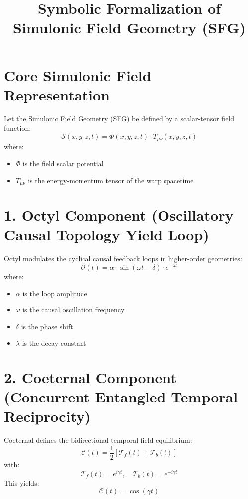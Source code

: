 \documentclass{article}
\begin{document}
\title{Symbolic Formalization of Simulonic Field Geometry (SFG)}
\author{}
\date{}
\maketitle

\section*{Core Simulonic Field Representation}

Let the Simulonic Field Geometry (SFG) be defined by a scalar-tensor field function:
\[
\mathcal{S}(x, y, z, t) = \Phi(x, y, z, t) \cdot T_{\mu\nu}(x, y, z, t)
\]
where:
\begin{itemize}
    \item $\Phi$ is the field scalar potential
    \item $T_{\mu\nu}$ is the energy-momentum tensor of the warp spacetime
\end{itemize}

\section*{1. Octyl Component (Oscillatory Causal Topology Yield Loop)}

Octyl modulates the cyclical causal feedback loops in higher-order geometries:
\[
\mathcal{O}(t) = \alpha \cdot \sin(\omega t + \delta) \cdot e^{-\lambda t}
\]
where:
\begin{itemize}
    \item $\alpha$ is the loop amplitude
    \item $\omega$ is the causal oscillation frequency
    \item $\delta$ is the phase shift
    \item $\lambda$ is the decay constant
\end{itemize}

\section*{2. Coeternal Component (Concurrent Entangled Temporal Reciprocity)}

Coeternal defines the bidirectional temporal field equilibrium:
\[
\mathcal{C}(t) = \frac{1}{2} \left[ \mathcal{T}_f(t) + \mathcal{T}_b(t) \right]
\]
with:
\[
\mathcal{T}_f(t) = e^{i \gamma t}, \quad \mathcal{T}_b(t) = e^{-i \gamma t}
\]
This yields:
\[
\mathcal{C}(t) = \cos(\gamma t)
\]
\end{document}
